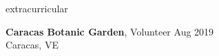 \documentclass{resume} %
\begin{document}

\begin{rSection}{extracurricular} %

    \textbf{Caracas Botanic Garden}, Volunteer
    \hfill {Aug 2019} \\ 
    \hfill{Caracas, VE}

\end{rSection}
\end{document}
